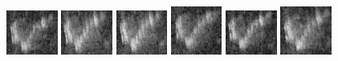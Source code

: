 \begin{figure}
    \includegraphics[width=0.15\textwidth]{chapters/images/dataset/all-class-images/hook/hook-84.jpg}
    \includegraphics[width=0.15\textwidth]{chapters/images/dataset/all-class-images/hook/hook-102.jpg}
    \includegraphics[width=0.15\textwidth]{chapters/images/dataset/all-class-images/hook/hook-103.jpg}
    \includegraphics[width=0.15\textwidth]{chapters/images/dataset/all-class-images/hook/hook-49.jpg}
    \includegraphics[width=0.15\textwidth]{chapters/images/dataset/all-class-images/hook/hook-81.jpg}
    \includegraphics[width=0.15\textwidth]{chapters/images/dataset/all-class-images/hook/hook-62.jpg}
    

\end{figure}
